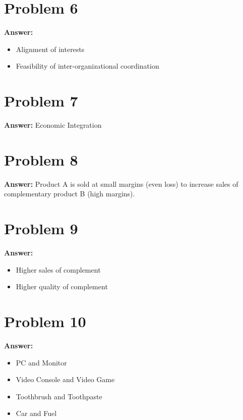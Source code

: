 \documentclass[11pt]{article}
\begin{document}
\section*{Problem 6}
\label{sec:org6faa3c3}

\textbf{Answer:}
\begin{itemize}
\item Alignment of interests
\item Feasibility of inter-organizational coordination
\end{itemize}
\section*{Problem 7}
\label{sec:org3582c7d}

\textbf{Answer:} Economic Integration
\section*{Problem 8}
\label{sec:org2030158}

\textbf{Answer:} Product A is sold at small margins (even loss) to increase sales of
complementary product B (high margins).
\section*{Problem 9}
\label{sec:org5629ebf}

\textbf{Answer:}
\begin{itemize}
\item Higher sales of complement
\item Higher quality of complement
\end{itemize}
\section*{Problem 10}
\label{sec:orge7f7b26}

\textbf{Answer:}
\begin{itemize}
\item PC and Monitor
\item Video Console and Video Game
\item Toothbrush and Toothpaste
\item Car and Fuel
\end{itemize}
\end{document}
